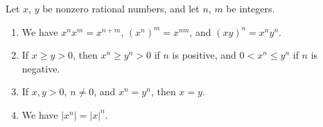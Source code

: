 \begin{proposition}\label{4.3.12}
Let \(x\), \(y\) be nonzero rational numbers, and let \(n\), \(m\) be integers.
\begin{enumerate}
    \item We have \(x^n x^m = x^{n + m}\), \((x^n)^m = x^{nm}\), and \((xy)^n = x^n y^n\).
    \item If \(x \geq y > 0\), then \(x^n \geq y^n > 0\) if \(n\) is positive, and \(0 < x^n \leq y^n\) if \(n\) is negative.
    \item If \(x, y > 0\), \(n \neq 0\), and \(x^n = y^n\), then \(x = y\).
    \item We have \(|x^n| = |x|^n\).
\end{enumerate}
\end{proposition}

